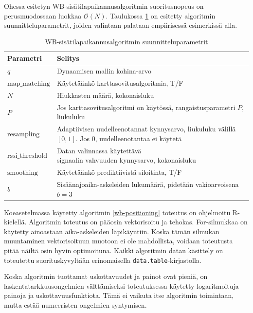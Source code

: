 \documentclass[
  12pt,
  a4paper, twoside]{book}
\begin{document}
Ohessa esitetyn WB-sisätilapaikannusalgoritmin suoritusnopeus on perusmuodossaan luokkaa \(\mathcal{O}(N)\). Taulukossa \ref{tab:wb-parametrit} on esitetty algoritmin suunnitteluparametrit, joiden valintaan palataan empiirisessä esimerkissä alla.

\begin{table}

\caption{\label{tab:wb-parametrit}WB-sisätilapaikannusalgoritmin suunnitteluparametrit}
\centering
\begin{tabular}[t]{ll}
\toprule
Parametri & Selitys\\
\midrule
$q$ & Dynaamisen mallin kohina-arvo\\
$\text{map\_matching}$ & Käytetäänkö karttasovitusalgoritmia, T/F\\
$N$ & Hiukkasten määrä, kokonaisluku\\
$P$ & \makecell[l]{Jos karttasovitusalgoritmi on käytössä,\\ rangaistusparametri $P$, liukuluku}\\
$\text{resampling}$ & \makecell[l]{Adaptiivisen uudelleenotannat kynnysarvo,\\ liukuluku välillä $[0,1]$. Jos $0$, uudelleenotantaa ei käytetä}\\
\addlinespace
$\text{rssi\_threshold}$ & \makecell[l]{Datan valinnassa käytettävä\\ signaalin vahvuuden kynnysarvo, kokonaisluku}\\
$\text{smoothing}$ & Käytetäänkö prediktiivistä siloitinta, T/F\\
$b$ & Sisäänajoaika-askeleiden lukumäärä, pidetään vakioarvoisena $b=3$\\
\bottomrule
\end{tabular}
\end{table}

Koeasetelmassa käytetty algoritmin \ref{wb-positioning} toteutus on ohjelmoitu R-kielellä. Algoritmin toteutus on pääosin vektorisoitu ja tehokas. For-silmukkaa on käytetty ainoastaan aika-askeleiden läpikäyntiin. Koska tämän silmukan muuntaminen vektorisoituun muotoon ei ole mahdollista, voidaan toteutusta pitää näiltä osin hyvin optimoituna. Kaikki algoritmin datan käsittely on toteutettu suorituskyvyltään erinomaisella \texttt{data.table}-kirjastolla.

Koska algoritmin tuottamat uskottavuudet ja painot ovat pieniä, on laskentatarkkuusongelmien välttämiseksi toteutuksessa käytetty logaritmoituja painoja ja uskottavuusfunktiota. Tämä ei vaikuta itse algoritmin toimintaan, mutta estää numeeristen ongelmien syntymisen.
\end{document}
